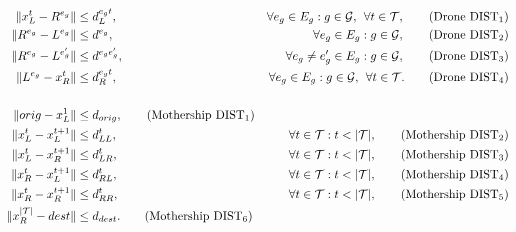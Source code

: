
\begin{align*}
\|x_L^t- R^{e_g}\| & \leq  d_L^{e_gt},  &\forall e_g\in E_g:g\in \mathcal{G}, \:\:\forall t\in \mathcal T, \tag{Drone DIST$_{1}$} \label{eq:drone-d1-async}\\
\|R^{e_g}- L^{e_g}\| & \leq  d^{e_g},  &\forall e_g\in E_g:g\in \mathcal{G}, \tag{Drone DIST$_{2}$} \label{eq:drone-d2-async}\\
\|R^{e_g}- L^{e'_g}\| & \leq  d^{e_ge'_g}, &\forall e_g\neq e_g'\in E_g:g\in \mathcal{G}, \tag{Drone DIST$_{3}$} \label{eq:drone-d3-async}\\
\|L^{e_g}- x_R^t\| & \leq  d_R^{e_gt}, &\forall e_g\in E_g:g\in \mathcal{G},\:\:\forall t\in \mathcal T. \tag{Drone DIST$_{4}$} \label{eq:drone-d4-async}\\\\
\|orig - x_L^1\| & \leq d_{orig}, \tag{Mothership DIST$_1$}\label{eq:mothership-d1-async}\\
\|x_L^t - x_L^{t+1}\| & \leq d_{LL}^{t}, &\forall t\in\mathcal T:t<|\mathcal T|, \tag{Mothership DIST$_{2}$}\label{eq:mothership-d2-async}\\
\|x_L^t - x_R^{t+1}\| & \leq d_{LR}^{t}, &\forall t\in\mathcal T:t<|\mathcal T|, \tag{Mothership DIST$_{3}$}\label{eq:mothership-d3-async}\\
\|x_R^t - x_L^{t+1}\| & \leq d_{RL}^{t}, &\forall t\in\mathcal T:t<|\mathcal T|, \tag{Mothership DIST$_{4}$}\label{eq:mothership-d4-async}\\
\|x_R^t - x_R^{t+1}\| & \leq d_{RR}^{t}, &\forall t\in\mathcal T:t<|\mathcal T|, \tag{Mothership DIST$_{5}$}\label{eq:mothership-d5-async}\\
\|x_R^{|\mathcal T|} - dest\| & \leq d_{dest}. \tag{Mothership DIST$_6$}\label{eq:mothership-d6-async}
\end{align*}

